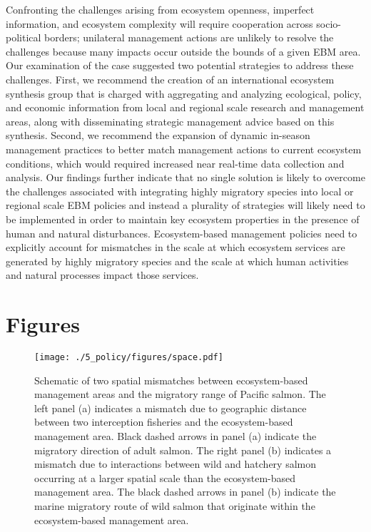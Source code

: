Confronting the challenges arising from ecosystem openness, imperfect
information, and ecosystem complexity will require cooperation across
socio-political borders; unilateral management actions are unlikely to
resolve the challenges because many impacts occur outside the bounds of
a given EBM area. Our examination of the case suggested two potential
strategies to address these challenges. First, we recommend the creation
of an international ecosystem synthesis group that is charged with
aggregating and analyzing ecological, policy, and economic information
from local and regional scale research and management areas, along with
disseminating strategic management advice based on this synthesis.
Second, we recommend the expansion of dynamic in-season management
practices to better match management actions to current ecosystem
conditions, which would required increased near real-time data
collection and analysis. Our findings further indicate that no single
solution is likely to overcome the challenges associated with
integrating highly migratory species into local or regional scale EBM
policies and instead a plurality of strategies will likely need to be
implemented in order to maintain key ecosystem properties in the
presence of human and natural disturbances. Ecosystem-based management
policies need to explicitly account for mismatches in the scale at which
ecosystem services are generated by highly migratory species and the
scale at which human activities and natural processes impact those
services.



\section{Figures}

\begin{figure}[htbp]
  \centering \texttt{[image: ./5\_policy/figures/space.pdf]}
  \caption[Schematic of two spatial mismatches between ecosystem-based
           management areas and the migratory range of Pacific
           salmon.]{Schematic of two spatial mismatches between ecosystem-based
           management areas and the migratory range of Pacific salmon. The left
           panel (a) indicates a mismatch due to geographic distance between two
           interception fisheries and the ecosystem-based management area. Black
           dashed arrows in panel (a) indicate the migratory direction of adult
           salmon. The right panel (b) indicates a mismatch due to interactions
           between wild and hatchery salmon occurring at a larger spatial scale
           than the ecosystem-based management area. The black dashed arrows in
           panel (b) indicate the marine migratory route of wild salmon that
           originate within the ecosystem-based management area.}
  \label{fig:ebm:1}
\end{figure}



